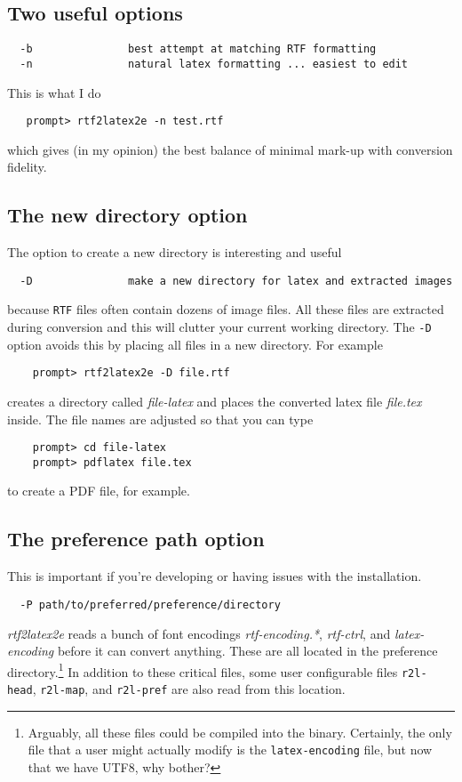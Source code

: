 \documentclass{article}
\def\rtf2latex2e{{\it rtf2latex2e}}
\begin{document}
\subsection{Two useful options}
\begin{verbatim}
  -b               best attempt at matching RTF formatting
  -n               natural latex formatting ... easiest to edit
\end{verbatim}
This is what I do
\begin{verbatim}
   prompt> rtf2latex2e -n test.rtf
\end{verbatim}
which gives (in my opinion) the best balance of minimal mark-up with conversion fidelity.

\subsection{The new directory option}
The option to create a new directory is interesting and useful
\begin{verbatim}
  -D               make a new directory for latex and extracted images
\end{verbatim}
because \texttt{RTF} files often contain dozens of image files.  All these files are extracted during conversion and this will clutter your current working directory.  The \texttt{-D} option avoids this by placing all files in a new directory.  For example
\begin{verbatim}
    prompt> rtf2latex2e -D file.rtf
\end{verbatim}
creates a directory called \textit{file-latex} and places the converted
latex file \textit{file.tex} inside.  The file names are adjusted so that
you can type 
\begin{verbatim}
    prompt> cd file-latex
    prompt> pdflatex file.tex
\end{verbatim}
to create a PDF file, for example.

\subsection{The preference path option}
This is important if you're developing or having issues with the installation.
\begin{verbatim}
  -P path/to/preferred/preference/directory
\end{verbatim}
\rtf2latex2e{}
reads a bunch of font encodings \textit{rtf-encoding.*}, \textit{rtf-ctrl}, and
\textit{latex-encoding} before it can convert anything.  These are all located
in the preference directory.\footnote{Arguably, all these files could be compiled
into the binary.  Certainly, the only file that a user might actually modify 
is the \texttt{latex-encoding} file, but now that we have UTF8, why bother?} 
In addition to these critical files, some user configurable files \texttt{r2l-head},
\texttt{r2l-map}, and \texttt{r2l-pref} are also read from this location.
\end{document}
